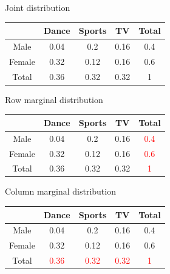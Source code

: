 \documentclass{beamer}\usepackage[]{graphicx}\usepackage[]{color}
\begin{document}
\begin{frame}[fragile]{Joint distribution}

\begin{tabular}{|c|c|c|c|c|}
\hline
& Dance & Sports & TV  & Total \\ \hline
Male  & 0.04 & 0.2 & 0.16 & 0.4 \\ \hline
Female & 0.32  & 0.12 & 0.16 & 0.6 \\ \hline
Total & 0.36 & 0.32 & 0.32 & 1 \\ \hline
\end{tabular}

\end{frame}

\begin{frame}[fragile]{Row marginal distribution}

\begin{tabular}{|c|c|c|c|c|}
\hline
& Dance & Sports & TV  & Total \\ \hline
Male  & 0.04 & 0.2 & 0.16 & \textcolor{red}{0.4} \\ \hline
Female & 0.32  & 0.12 & 0.16 & \textcolor{red}{0.6} \\ \hline
Total & 0.36 & 0.32 & 0.32 & \textcolor{red}{1} \\ \hline
\end{tabular}

\end{frame}

\begin{frame}[fragile]{Column marginal distribution}

\begin{tabular}{|c|c|c|c|c|}
\hline
& Dance & Sports & TV  & Total \\ \hline
Male  & 0.04 & 0.2 & 0.16 &  0.4 \\ \hline
Female & 0.32  & 0.12 & 0.16 & 0.6 \\ \hline
Total & \textcolor{red}{0.36} & \textcolor{red}{0.32} & \textcolor{red}{0.32} & \textcolor{red}{1} \\ \hline
\end{tabular}

\end{frame}
\end{document}
